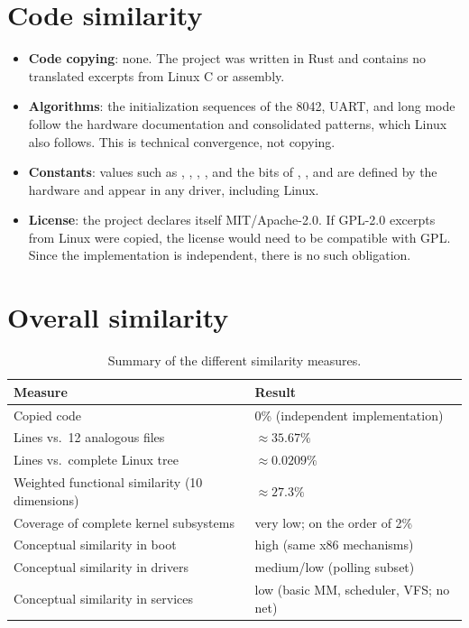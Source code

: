 \section{Code similarity}

\begin{itemize}
  \item \textbf{Code copying}: none. The project was written in Rust
        and contains no translated excerpts from Linux C or assembly.
  \item \textbf{Algorithms}: the initialization sequences of the 8042,
        UART, and long mode follow the hardware documentation and consolidated
        patterns, which Linux also follows. This is technical
        convergence, not copying.
  \item \textbf{Constants}: values such as , ,
        , ,  and the bits of ,
        , and  are defined by the hardware and appear in
        any driver, including Linux.
  \item \textbf{License}: the project declares itself MIT/Apache-2.0. If
        GPL-2.0 excerpts from Linux were copied, the license would need to be
        compatible with GPL. Since the implementation is
        independent, there is no such obligation.
\end{itemize}

\section{Overall similarity}

\begin{table}[H]
\centering
\caption{Summary of the different similarity measures.}
\label{tab:resumo-similaridade}
\begin{tabularx}{\linewidth}{@{}lX@{}}
\toprule
\textbf{Measure} & \textbf{Result} \\
\midrule
Copied code & 0\% (independent implementation) \\
Lines vs.\ 12 analogous files & $\approx 35.67\%$ \\
Lines vs.\ complete Linux tree & $\approx 0.0209\%$ \\
Weighted functional similarity (10 dimensions) & $\approx 27.3\%$ \\
Coverage of complete kernel subsystems & very low; on the order of 2\% \\
Conceptual similarity in boot & high (same x86 mechanisms) \\
Conceptual similarity in drivers & medium/low (polling subset) \\
Conceptual similarity in services & low (basic MM, scheduler, VFS; no net) \\
\bottomrule
\end{tabularx}
\end{table}

